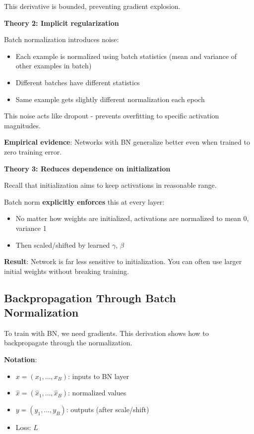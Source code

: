 This derivative is bounded, preventing gradient explosion.

\textbf{Theory 2: Implicit regularization}

Batch normalization introduces noise:
\begin{itemize}
\item Each example is normalized using batch statistics (mean and variance of other examples in batch)
\item Different batches have different statistics
\item Same example gets slightly different normalization each epoch
\end{itemize}

This noise acts like dropout - prevents overfitting to specific activation magnitudes.

\textbf{Empirical evidence}: Networks with BN generalize better even when trained to zero training error.

\textbf{Theory 3: Reduces dependence on initialization}

Recall that initialization aims to keep activations in reasonable range.

Batch norm \textbf{explicitly enforces} this at every layer:
\begin{itemize}
\item No matter how weights are initialized, activations are normalized to mean 0, variance 1
\item Then scaled/shifted by learned $\gamma$, $\beta$
\end{itemize}

\textbf{Result}: Network is far less sensitive to initialization. You can often use larger initial weights without breaking training.

\subsection{Backpropagation Through Batch Normalization}

To train with BN, we need gradients. This derivation shows how to backpropagate through the normalization.

\textbf{Notation}:
\begin{itemize}
\item $x = (x_1, \ldots, x_B)$: inputs to BN layer
\item $\hat{x} = (\hat{x}_1, \ldots, \hat{x}_B)$: normalized values
\item $y = (y_1, \ldots, y_B)$: outputs (after scale/shift)
\item Loss: $L$
\end{itemize}


